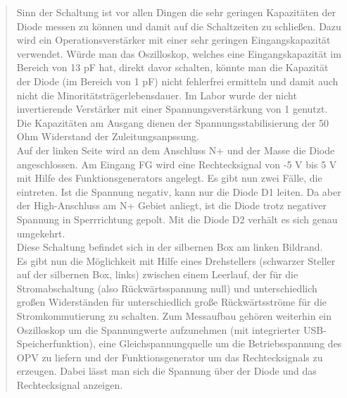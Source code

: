 \begin{quote}
	Sinn der Schaltung ist vor allen Dingen die sehr geringen Kapazitäten der 
	Diode messen zu können und damit auf die Schaltzeiten zu schließen. Dazu 
	wird ein Operationsverstärker mit einer sehr geringen Eingangskapazität 
	verwendet. Würde man das Oszilloskop, welches eine Eingangskapazität im 
	Bereich von 13 pF hat, direkt davor schalten, könnte man die Kapazität der 
	Diode (im Bereich von 1 pF) nicht fehlerfrei ermitteln und damit auch nicht
	die Minoritätsträgerlebensdauer. Im Labor wurde der nicht invertierende 
	Verstärker mit einer Spannungsverstärkung von 1 genutzt. Die Kapazitäten am 
	Ausgang dienen der Spannungsstabilisierung der 50 Ohm Widerstand der 
	Zuleitungsanpssung.	\\
	Auf der linken Seite wird an dem Anschluss N+ und der Masse die Diode 
	angeschlossen. Am Eingang FG wird eine Rechtecksignal von -5 V bis 5 V mit
	Hilfe des Funktionsgenerators angelegt. Es gibt nun zwei Fälle, die 
	eintreten. Ist die Spannung negativ, kann nur die Diode D1 leiten. Da aber 
	der High-Anschluss am N+ Gebiet anliegt, ist die Diode trotz negativer 
	Spannung in Sperrrichtung gepolt. Mit die Diode D2 verhält es sich genau 
	umgekehrt.\\
	Diese Schaltung befindet sich in der silbernen Box am linken Bildrand.\\
	Es gibt nun die Möglichkeit mit Hilfe eines Drehstellers (schwarzer Steller
	auf der silbernen Box, links) zwischen einem Leerlauf, der für die 
	Stromabschaltung (also Rückwärtsspannung null) und unterschiedlich großen 
	Widerständen für unterschiedlich große Rückwärtsströme für die 
	Stromkommutierung zu schalten. Zum Messaufbau gehören weiterhin ein 
	Oszilloskop um die Spannungwerte aufzunehmen (mit integrierter USB-
	Speicherfunktion), eine Gleichspannungquelle um die Betriebsspannung des
	OPV zu liefern und der Funktionsgenerator um das Rechtecksignals zu 
	erzeugen. Dabei lässt man sich die Spannung über der Diode und das 
	Rechtecksignal anzeigen.
	
	\vspace{2em}
	

\end{quote}
